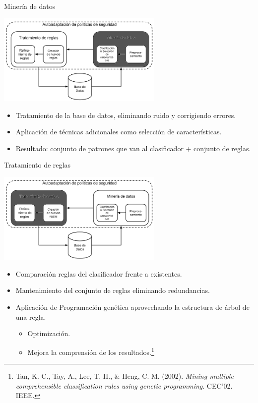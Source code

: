\documentclass{beamer}
\begin{document}
\begin{frame}{Minería de datos}

\begin{center}
\includegraphics[width=0.6\textwidth]{./imgs/KRS1.png}
\end{center}

\begin{itemize}
  \item<1-> Tratamiento de la base de datos, eliminando ruido y corrigiendo errores.
  \item<2-> Aplicación de técnicas adicionales como selección de características.
  \item<3-> Resultado: conjunto de patrones que van al clasificador + conjunto de reglas.
\end{itemize}

\end{frame}

\begin{frame}{Tratamiento de reglas}

\begin{center}
\includegraphics[width=0.6\textwidth]{./imgs/KRS2.png}
\end{center}

\begin{itemize}
  \item<1-> Comparación reglas del clasificador frente a existentes.
  \item<2-> Mantenimiento del conjunto de reglas eliminando redundancias.
  \item<3-> Aplicación de Programación genética aprovechando la estructura de árbol de una regla.
  \begin{itemize}
    \item Optimización.
    \item Mejora la comprensión de los resultados.\footnote{Tan, K. C., Tay, A., Lee, T. H., \& Heng, C. M. (2002). \textit{Mining multiple comprehensible classification rules using genetic programming}. CEC'02. IEEE.}
  \end{itemize}
\end{itemize}

\end{frame}
\end{document}
